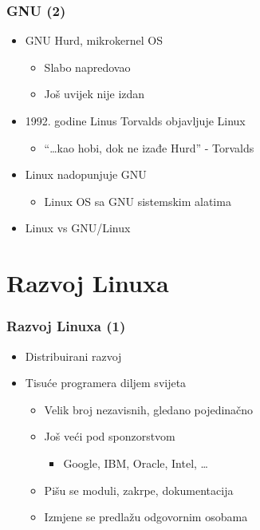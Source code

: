 \documentclass{beamer}
\begin{document}
\begin{frame}[t]
\frametitle{GNU (2)}
\begin{itemize}
  \item GNU Hurd, mikrokernel OS
  \begin{itemize}
    \item Slabo napredovao
    \item Još uvijek nije izdan
  \end{itemize}
  \item 1992. godine Linus Torvalds objavljuje Linux
  \begin{itemize}
    \item ``\ldots kao hobi, dok ne izađe Hurd'' - Torvalds
  \end{itemize}
  \item Linux nadopunjuje GNU
  \begin{itemize}
    \item Linux OS sa GNU sistemskim alatima
  \end{itemize}
  \item Linux vs GNU/Linux
\end{itemize}
\end{frame}

\section{Razvoj Linuxa}
\begin{frame}[t]
\frametitle{Razvoj Linuxa (1)}
\begin{itemize}
  \item Distribuirani razvoj 
  \item Tisuće programera diljem svijeta
  \begin{itemize}
    \item Velik broj nezavisnih, gledano pojedinačno
    \item Još veći pod sponzorstvom
    \begin{itemize}
      \item Google, IBM, Oracle, Intel, \ldots
    \end{itemize}
  \item Pišu se moduli, zakrpe, dokumentacija
  \item Izmjene se predlažu odgovornim osobama
  \end{itemize}
\end{itemize}
\end{frame}
\end{document}
